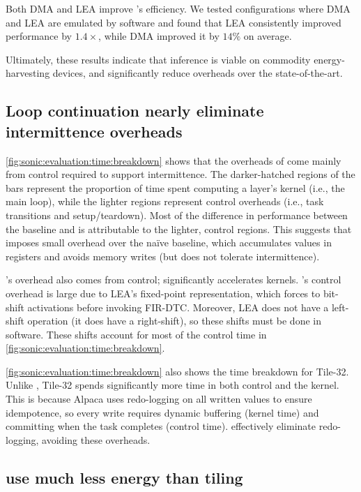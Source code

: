 Both DMA and LEA improve \tails's efficiency. We tested configurations 
where DMA and LEA are emulated by software and found that LEA consistently 
improved performance by $1.4\times$, while DMA improved it by $14\%$ on average.

Ultimately, these results indicate that inference is viable on
commodity energy-harvesting devices, and \sonictails significantly reduce overheads over
the state-of-the-art. 

\figSONICEvalTimeBreak

\subsection{Loop continuation nearly eliminate intermittence overheads}
\autoref{fig:sonic:evaluation:time:breakdown} shows that the overheads of \sonictails come mainly
from control required to support intermittence. 
%
The darker-hatched regions of the bars represent the proportion of time spent 
computing a layer's kernel (i.e., the main loop), while the lighter regions represent control overheads (i.e., task transitions and setup/teardown).
%
Most of the difference in performance between the baseline and \sonic is attributable 
to the lighter, control regions. 
%
This suggests that \sonic imposes small overhead
over the na\"ive baseline, which accumulates values in registers and avoids memory writes (but does not tolerate intermittence).

\tails's overhead also comes from control; \tails significantly accelerates kernels.
%
\tails's control overhead is large due to LEA's fixed-point representation,
which forces \tails to bit-shift activations before invoking FIR-DTC.
%
Moreover, LEA does not have a left-shift operation (it does have a right-shift),
so these shifts must be done in software.
%
These shifts account for most of the control time in \autoref{fig:sonic:evaluation:time:breakdown}.

\autoref{fig:sonic:evaluation:time:breakdown} also shows the time breakdown for Tile-32.
%
Unlike \sonictails,
Tile-32 spends significantly more time in both control and the kernel.
%
This is because Alpaca uses redo-logging on all written values to ensure idempotence,
so every write requires dynamic buffering (kernel time)
and committing when the task completes (control time).
%
\sonictails effectively eliminate redo-logging, avoiding these overheads.

\figSONICEvalEnergy

\subsection{\sonictails use much less energy than tiling}

